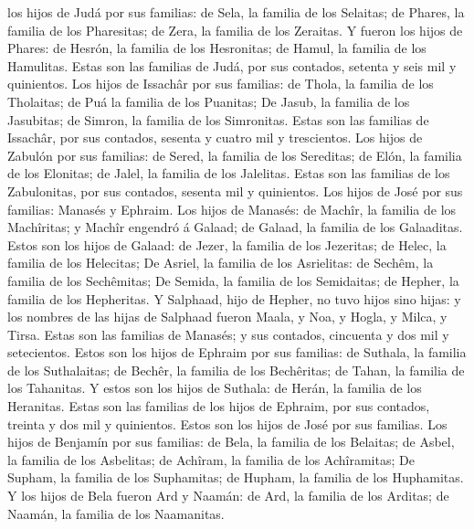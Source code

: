 los hijos de Judá por sus familias: de Sela, la familia de los Selaitas;
de Phares, la familia de los Pharesitas; de Zera, la familia de los
Zeraitas.  Y fueron los hijos de Phares: de Hesrón, la
familia de los Hesronitas; de Hamul, la familia de los Hamulitas.
 Estas son las familias de Judá, por sus contados,
setenta y seis mil y quinientos.  Los hijos de Issachâr
por sus familias: de Thola, la familia de los Tholaitas; de Puá la
familia de los Puanitas;  De Jasub, la familia de los
Jasubitas; de Simron, la familia de los Simronitas. 
Estas son las familias de Issachâr, por sus contados, sesenta y cuatro
mil y trescientos.  Los hijos de Zabulón por sus
familias: de Sered, la familia de los Sereditas; de Elón, la familia de
los Elonitas; de Jalel, la familia de los Jalelitas. 
Estas son las familias de los Zabulonitas, por sus contados, sesenta mil
y quinientos.  Los hijos de José por sus familias:
Manasés y Ephraim.  Los hijos de Manasés: de Machîr, la
familia de los Machîritas; y Machîr engendró á Galaad; de Galaad, la
familia de los Galaaditas.  Estos son los hijos de
Galaad: de Jezer, la familia de los Jezeritas; de Helec, la familia de
los Helecitas;  De Asriel, la familia de los Asrielitas:
de Sechêm, la familia de los Sechêmitas;  De Semida, la
familia de los Semidaitas; de Hepher, la familia de los Hepheritas.
 Y Salphaad, hijo de Hepher, no tuvo hijos sino hijas: y
los nombres de las hijas de Salphaad fueron Maala, y Noa, y Hogla, y
Milca, y Tirsa.  Estas son las familias de Manasés; y sus
contados, cincuenta y dos mil y setecientos.  Estos son
los hijos de Ephraim por sus familias: de Suthala, la familia de los
Suthalaitas; de Bechêr, la familia de los Bechêritas; de Tahan, la
familia de los Tahanitas.  Y estos son los hijos de
Suthala: de Herán, la familia de los Heranitas.  Estas
son las familias de los hijos de Ephraim, por sus contados, treinta y
dos mil y quinientos. Estos son los hijos de José por sus familias.
 Los hijos de Benjamín por sus familias: de Bela, la
familia de los Belaitas; de Asbel, la familia de los Asbelitas; de
Achîram, la familia de los Achîramitas;  De Supham, la
familia de los Suphamitas; de Hupham, la familia de los Huphamitas.
 Y los hijos de Bela fueron Ard y Naamán: de Ard, la
familia de los Arditas; de Naamán, la familia de los Naamanitas.
